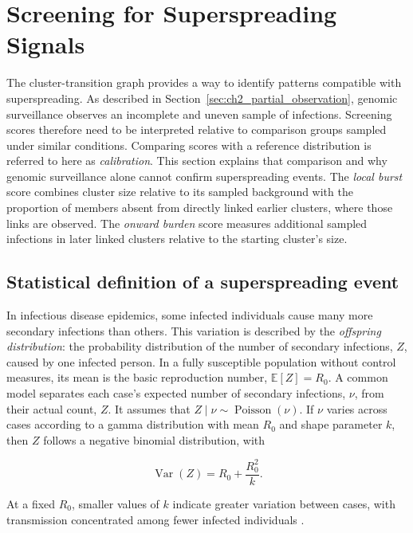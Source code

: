 \section{Screening for Superspreading Signals}\label{sec:ch2_superspreading_signals}

The cluster-transition graph provides a way to identify patterns compatible with superspreading. As described in Section~\ref{sec:ch2_partial_observation}, genomic surveillance observes an incomplete and uneven sample of infections. Screening scores therefore need to be interpreted relative to comparison groups sampled under similar conditions. Comparing scores with a reference distribution is referred to here as \emph{calibration}. This section explains that comparison and why genomic surveillance alone cannot confirm superspreading events. The \emph{local burst} score combines cluster size relative to its sampled background with the proportion of members absent from directly linked earlier clusters, where those links are observed. The \emph{onward burden} score measures additional sampled infections in later linked clusters relative to the starting cluster's size.

\subsection{Statistical definition of a superspreading event}\label{sec:ch2_transmission_heterogeneity}

In infectious disease epidemics, some infected individuals cause many more secondary infections than others. This variation is described by the \emph{offspring distribution}: the probability distribution of the number of secondary infections, $Z$, caused by one infected person. In a fully susceptible population without control measures, its mean is the basic reproduction number, $\mathbb{E}[Z] = R_0$. A common model separates each case's expected number of secondary infections, $\nu$, from their actual count, $Z$. It assumes that $Z \mid \nu \sim \operatorname{Poisson}(\nu)$. If $\nu$ varies across cases according to a gamma distribution with mean $R_0$ and shape parameter $k$, then $Z$ follows a negative binomial distribution, with

\[
    \operatorname{Var}(Z) = R_0 + \frac{R_0^{2}}{k}.
\]

At a fixed $R_0$, smaller values of $k$ indicate greater variation between cases, with transmission concentrated among fewer infected individuals \citep{LloydSmith2005}. 

